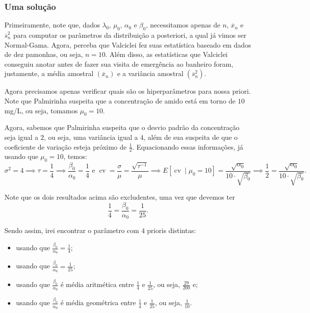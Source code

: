 \documentclass{article}
\begin{document}
\subsubsection*{Uma solução}

Primeiramente, note que, dados $\lambda_0$, $\mu_0$, $\alpha_0$ e $\beta_0$, necessitamos apenas de $n$, $\overline{x}_n$ e $\overline{s}_n^2$ para computar os parâmetros da distribuição a posteriori, a qual já vimos ser Normal-Gama. Agora, perceba que Valciclei fez suas estatística baseado em dados de dez pamonhas, ou seja, $n = 10$. Além disso, as estatísticas que Valciclei conseguiu anotar antes de fazer sua visita de emergência ao banheiro foram, justamente, a média amostral $\left(\overline{x}_n\right)$ e a variância amostral $\left(\overline{s}_n^2\right)$.

Agora precisamos apenas verificar quais são os hiperparâmetros para nossa priori. Note que Palmirinha suspeita que a concentração de amido está em torno de $10$ mg/L, ou seja, tomamos $\mu_0 = 10$.

Agora, sabemos que Palmirinha suspeita que o desvio padrão da concentração seja igual a $2$, ou seja, uma variância igual a $4$, além de sua suspeita de que o coeficiente de variação esteja próximo de $\frac{1}{2}$. Equacionando essas informações, já usando que $\mu_0 = 10$, temos:
\[\sigma^2 = 4 \implies \tau = \dfrac{1}{4} \implies \dfrac{\beta_0}{\alpha_0} = \dfrac{1}{4} \text{ e } \operatorname{cv} = \dfrac{\sigma}{\mu} = \dfrac{\sqrt{\tau^{-1}}}{\mu} \implies E\left[\operatorname{cv} \mid \mu_0 = 10\right] = \dfrac{\sqrt{\alpha_0}}{10\cdot \sqrt{\beta_0}} \implies \dfrac{1}{2} = \dfrac{\sqrt{\alpha_0}}{10\cdot \sqrt{\beta_0}}.\]

Note que os dois resultados acima são excludentes, uma vez que devemos ter
\[\dfrac{1}{4} = \dfrac{\beta_0}{\alpha_0} = \dfrac{1}{25}.\]

Sendo assim, irei encontrar o parâmetro com $4$ prioris distintas:
\begin{itemize}
    \item
        usando que $\frac{\beta_0}{\alpha_0} = \frac{1}{4}$;
        
    \item
        usando que $\frac{\beta_0}{\alpha_0} = \frac{1}{25}$;
        
    \item
        usando que $\frac{\beta_0}{\alpha_0}$ é média aritmética entre $\frac{1}{4}$ e $\frac{1}{25}$, ou seja, $\frac{29}{200}$ e;
        
    \item
        usando que $\frac{\beta_0}{\alpha_0}$ é média geométrica entre $\frac{1}{4}$ e $\frac{1}{25}$, ou seja, $\frac{1}{10}$.
\end{itemize}
\end{document}
